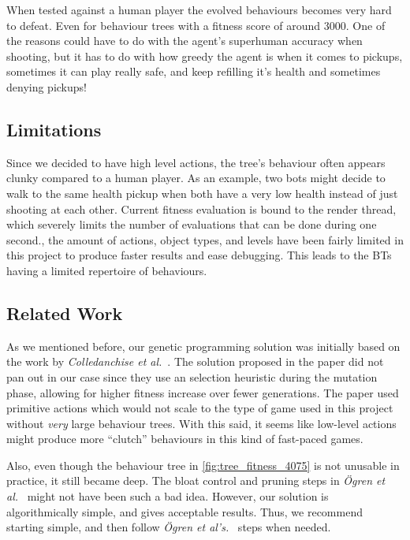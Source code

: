 \documentclass[a4paper, twocolumn]{article}
\begin{document}
    When tested against a human player the evolved behaviours becomes very hard to defeat. Even for behaviour trees with a fitness score of around 3000. One of the reasons could have to do with the agent's superhuman accuracy when shooting, but it has to do with how greedy the agent is when it comes to pickups, sometimes it can play really safe, and keep refilling it's health and sometimes denying pickups!

    \subsection*{Limitations}

    Since we decided to have high level actions, the tree's behaviour often appears clunky compared to a human player. As an example, two bots might decide to walk to the same health pickup when both have a very low health instead of just shooting at each other. Current fitness evaluation is bound to the render thread, which severely limits the number of evaluations that can be done during one second., the amount of actions, object types, and levels have been fairly limited in this project to produce faster results and ease debugging. This leads to the BTs having a limited repertoire of behaviours.

    \vspace{-0.5em}

    \subsection*{Related Work}

    As we mentioned before, our genetic programming solution was initially based on the work by \emph{Colledanchise et al.}~\cite{colledanchise2015learning}. The solution proposed in the paper did not pan out in our case since they use an selection heuristic during the mutation phase, allowing for higher fitness increase over fewer generations. The paper used primitive actions which would not scale to the type of game used in this project without \emph{very} large behaviour trees. With this said, it seems like low-level actions might produce more ``clutch'' behaviours in this kind of fast-paced games. 

    Also, even though the behaviour tree in \cref{fig:tree_fitness_4075} is not unusable in practice, it still became deep. The bloat control and pruning steps in \emph{{\"O}gren et al.}~\cite{colledanchise2015learning} might not have been such a bad idea. However, our solution is algorithmically simple, and gives acceptable results. Thus, we recommend starting simple, and then follow \emph{{\"O}gren et al's.}~\cite{colledanchise2015learning} steps when needed.
\end{document}
